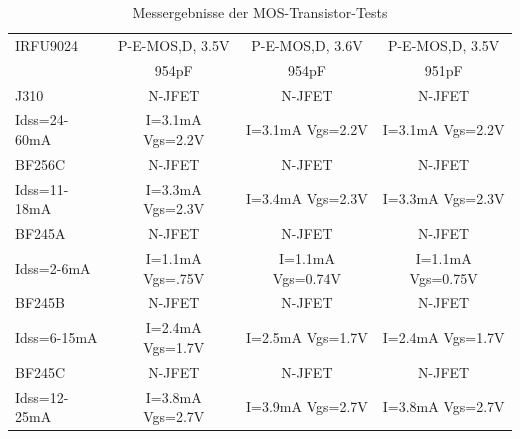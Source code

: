\begin{table}[H]
\begin{center}
\begin{tabular}{| l | c | c | c |}
    \hline
IRFU9024     & P-E-MOS,D, 3.5V  & P-E-MOS,D, 3.6V  & P-E-MOS,D, 3.5V \\
             & 954pF            & 954pF            & 951pF \\
    \hline
J310         & N-JFET           & N-JFET           & N-JFET\\
Idss=24-60mA & I=3.1mA Vgs=2.2V & I=3.1mA Vgs=2.2V & I=3.1mA Vgs=2.2V \\
    \hline
BF256C       & N-JFET           & N-JFET           & N-JFET\\
Idss=11-18mA & I=3.3mA Vgs=2.3V & I=3.4mA Vgs=2.3V & I=3.3mA Vgs=2.3V \\
    \hline
BF245A       & N-JFET           & N-JFET           & N-JFET\\
Idss=2-6mA   & I=1.1mA Vgs=.75V & I=1.1mA Vgs=0.74V & I=1.1mA Vgs=0.75V \\
    \hline
BF245B       & N-JFET           & N-JFET           & N-JFET\\
Idss=6-15mA  & I=2.4mA Vgs=1.7V & I=2.5mA Vgs=1.7V & I=2.4mA Vgs=1.7V \\
    \hline
BF245C       & N-JFET           & N-JFET           & N-JFET\\
Idss=12-25mA & I=3.8mA Vgs=2.7V & I=3.9mA Vgs=2.7V & I=3.8mA Vgs=2.7V \\
    \hline
    \end{tabular}
  \end{center}
  \caption{Messergebnisse der MOS-Transistor-Tests}
  \label{tab:mos} 
\end{table}
